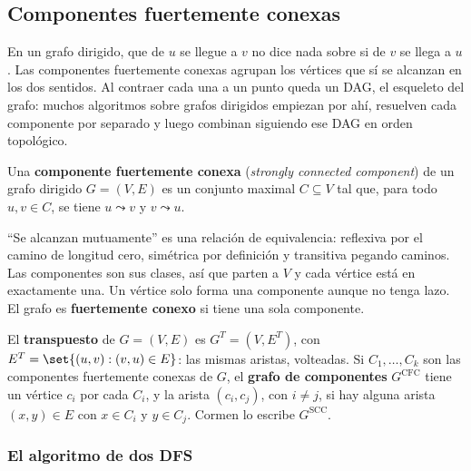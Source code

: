 \documentclass[11pt,letterpaper]{article}
\begin{document}

\subsection*{Componentes fuertemente conexas}

En un grafo dirigido, que de $u$ se llegue a $v$ no dice nada sobre si
de $v$ se llega a $u$. Las componentes fuertemente conexas agrupan los
vértices que sí se alcanzan en los dos sentidos. Al contraer cada una a
un punto queda un DAG, el esqueleto del grafo: muchos algoritmos sobre
grafos dirigidos empiezan por ahí, resuelven cada componente por
separado y luego combinan siguiendo ese DAG en orden topológico.

\begin{definicion}
  \label{def:componente-fuerte}
  Una \textbf{componente fuertemente conexa} (\textit{strongly
  connected component}) de un grafo dirigido $G = (V, E)$ es un
  conjunto maximal $C \subseteq V$ tal que, para todo $u, v \in C$, se
  tiene $u \leadsto v$ y $v \leadsto u$.
\end{definicion}

``Se alcanzan mutuamente'' es una relación de equivalencia: reflexiva
por el camino de longitud cero, simétrica por definición y transitiva
pegando caminos. Las componentes son sus clases, así que parten a $V$ y
cada vértice está en exactamente una. Un vértice solo forma una
componente aunque no tenga lazo. El grafo es \textbf{fuertemente
conexo} si tiene una sola componente.

\begin{definicion}
  \label{def:grafo-componentes}
  El \textbf{transpuesto} de $G = (V, E)$ es $G^T = (V, E^T)$, con
  $E^T = \set{(u, v) : (v, u) \in E}$: las mismas aristas, volteadas.
  Si $C_1, \dots, C_k$ son las componentes fuertemente conexas de $G$,
  el \textbf{grafo de componentes} $G^{\text{CFC}}$ tiene un vértice
  $c_i$ por cada $C_i$, y la arista $(c_i, c_j)$, con $i \neq j$, si
  hay alguna arista $(x, y) \in E$ con $x \in C_i$ y $y \in C_j$.
  Cormen lo escribe $G^{\text{SCC}}$.
\end{definicion}

\subsubsection*{El algoritmo de dos DFS}
\end{document}
